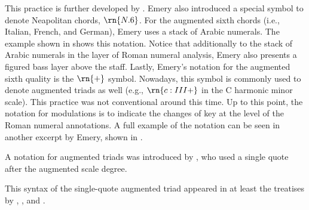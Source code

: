 This practice is further developed by
\textcite{emery1879elements}. Emery also introduced a
special symbol to denote Neapolitan chords, $\rn{N.6}$. For
the augmented sixth chords (i.e., Italian, French, and
German), Emery uses a stack of Arabic numerals. The example
shown in  shows
this notation. Notice that additionally to the stack of
Arabic numerals in the layer of Roman numeral analysis,
Emery also presents a figured bass layer above the staff.
Lastly, Emery's notation for the augmented sixth quality is
the $\rn{+}$ symbol. Nowadays, this symbol is commonly used
to denote augmented triads as well (e.g., $\rn{c:III+}$ in
the C harmonic minor scale). This practice was not
conventional around this time. Up to this point, the
notation for modulations is to indicate the changes of key
at the level of the Roman numeral annotations. A full
example of the notation can be seen in another excerpt by
Emery, shown in
.


A notation for augmented triads was introduced by
\textcite{jadassohn1883lehrbuch}, who used a single quote
after the augmented scale degree.


This syntax of the single-quote augmented triad appeared in
at least the treatises by \textcite{broekhoven1889system},
\textcite{buwa1893schule}, and
\textcite{shepard1896harmony}.


